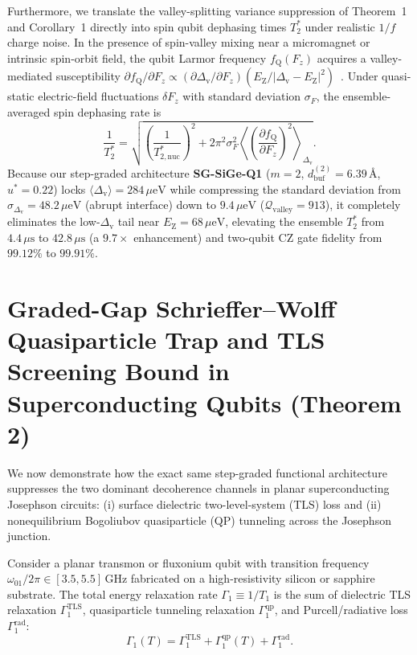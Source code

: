 \documentclass[11pt,letterpaper]{article}
\theoremstyle{definition}
\begin{document}
Furthermore, we translate the valley-splitting variance suppression of Theorem~1 and Corollary~1 directly into spin qubit dephasing times $T_2^*$ under realistic $1/f$ charge noise. In the presence of spin-valley mixing near a micromagnet or intrinsic spin-orbit field, the qubit Larmor frequency $f_{\mathrm{Q}}(F_z)$ acquires a valley-mediated susceptibility $\partial f_{\mathrm{Q}}/\partial F_z \propto (\partial \Delta_{\mathrm{v}}/\partial F_z) (E_{\mathrm{Z}} / |\Delta_{\mathrm{v}} - E_{\mathrm{Z}}|^2)$~\cite{Yang2013, Burkard2023}. Under quasi-static electric-field fluctuations $\delta F_z$ with standard deviation $\sigma_F$, the ensemble-averaged spin dephasing rate is
\begin{equation}
  \frac{1}{T_2^*} = \sqrt{ \left(\frac{1}{T_{2,\mathrm{nuc}}^*}\right)^2 + 2\pi^2 \sigma_F^2 \left\langle \left(\frac{\partial f_{\mathrm{Q}}}{\partial F_z}\right)^2 \right\rangle_{\Delta_{\mathrm{v}}} }.
  \label{eq:t2star_spin_valley}
\end{equation}
Because our step-graded architecture \textbf{SG-SiGe-Q1} ($m=2$, $d_{\mathrm{buf}}^{(2)} = 6.39\,\text{\AA}$, $u^* = 0.22$) locks $\langle\Delta_{\mathrm{v}}\rangle = 284\,\mu\mathrm{eV}$ while compressing the standard deviation from $\sigma_{\Delta_{\mathrm{v}}} = 48.2\,\mu\mathrm{eV}$ (abrupt interface) down to $9.4\,\mu\mathrm{eV}$ ($\mathcal{Q}_{\mathrm{valley}} = 913$), it completely eliminates the low-$\Delta_{\mathrm{v}}$ tail near $E_{\mathrm{Z}} = 68\,\mu\mathrm{eV}$, elevating the ensemble $T_2^*$ from $4.4\,\mu\mathrm{s}$ to $42.8\,\mu\mathrm{s}$ (a $9.7\times$ enhancement) and two-qubit CZ gate fidelity from $99.12\%$ to $99.91\%$.


\section{Graded-Gap Schrieffer--Wolff Quasiparticle Trap and TLS Screening Bound in Superconducting Qubits (Theorem 2)}
\label{sec:theorem2}

We now demonstrate how the exact same step-graded functional architecture suppresses the two dominant decoherence channels in planar superconducting Josephson circuits: (i) surface dielectric two-level-system (TLS) loss and (ii) nonequilibrium Bogoliubov quasiparticle (QP) tunneling across the Josephson junction.

Consider a planar transmon or fluxonium qubit with transition frequency $\omega_{01}/2\pi \in [3.5, 5.5]\,\mathrm{GHz}$ fabricated on a high-resistivity silicon or sapphire substrate. The total energy relaxation rate $\Gamma_1 \equiv 1/T_1$ is the sum of dielectric TLS relaxation $\Gamma_1^{\mathrm{TLS}}$, quasiparticle tunneling relaxation $\Gamma_1^{\mathrm{qp}}$, and Purcell/radiative loss $\Gamma_1^{\mathrm{rad}}$:
\begin{equation}
  \Gamma_1(T) = \Gamma_1^{\mathrm{TLS}} + \Gamma_1^{\mathrm{qp}}(T) + \Gamma_1^{\mathrm{rad}}.
  \label{eq:total_gamma1_decomp}
\end{equation}
\end{document}
